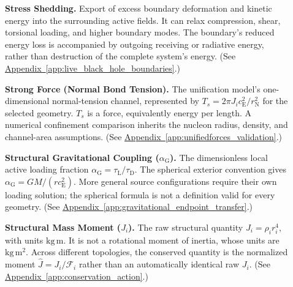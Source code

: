 \begin{description}
\item[] \begin{minipage}[t]{\linewidth}
\textbf{Stress Shedding.} Export of excess boundary deformation and kinetic energy into the surrounding active fields. It can relax compression, shear, torsional loading, and higher boundary modes. The boundary's reduced energy loss is accompanied by outgoing receiving or radiative energy, rather than destruction of the complete system's energy.
(See \hyperref[app:live_black_hole_boundaries]{Appendix~\ref*{app:live_black_hole_boundaries}}.)
\end{minipage}

\item[] \begin{minipage}[t]{\linewidth}
\textbf{Strong Force (Normal Bond Tension).} The unification model's one-dimensional normal-tension channel, represented by $T_s=2\pi J_i c_{\mathrm E}^2/r_{\mathrm N}^2$ for the selected geometry. $T_s$ is a force, equivalently energy per length. A numerical confinement comparison inherits the nucleon radius, density, and channel-area assumptions.
(See \hyperref[app:unifiedforces_validation]{Appendix~\ref*{app:unifiedforces_validation}}.)
\end{minipage}

\item[] \begin{minipage}[t]{\linewidth}
\textbf{Structural Gravitational Coupling ($\alpha_{\mathrm G}$).} The dimensionless local active loading fraction $\alpha_{\mathrm G}=\tau_{\mathrm L}/\tau_{\mathrm D}$. The spherical exterior convention gives $\alpha_{\mathrm G}=GM/(rc_{\mathrm E}^2)$. More general source configurations require their own loading solution; the spherical formula is not a definition valid for every geometry.
(See \hyperref[app:gravitational_endpoint_transfer]{Appendix~\ref*{app:gravitational_endpoint_transfer}}.)
\end{minipage}

\item[] \begin{minipage}[t]{\linewidth}
\textbf{Structural Mass Moment ($J_i$).} The raw structural quantity $J_i=\rho_i r_i^4$, with units $\mathrm{kg\,m}$. It is not a rotational moment of inertia, whose units are $\mathrm{kg\,m^2}$. Across different topologies, the conserved quantity is the normalized moment $\hat J=J_i/\mathcal F_i$ rather than an automatically identical raw $J_i$.
(See \hyperref[app:conservation_action]{Appendix~\ref*{app:conservation_action}}.)
\end{minipage}


\end{description}
